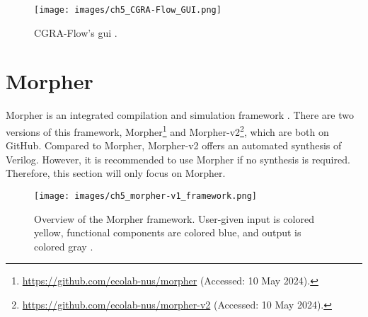     \begin{figure}[htb]
      \centering
      \texttt{[image: images/ch5\_CGRA-Flow\_GUI.png]}
      \caption{CGRA-Flow's \acf{gui} \cite{cgra-flow}.}
      \label{fig:cgra-flow_gui}
    \end{figure}

\section{Morpher}\label{section:morpher}
    Morpher is an integrated compilation and simulation framework \cite{morpher}.
    There are two versions of this framework, Morpher\footnote{\url{https://github.com/ecolab-nus/morpher} (Accessed: 10 May 2024).} and 
    Morpher-v2\footnote{\url{https://github.com/ecolab-nus/morpher-v2} (Accessed: 10 May 2024).}, which are both on GitHub.
    Compared to Morpher, Morpher-v2 offers an automated synthesis of Verilog.
    However, it is recommended to use Morpher if no synthesis is required.
    Therefore, this section will only focus on Morpher.

    \begin{figure}[htb]
      \centering
      \texttt{[image: images/ch5\_morpher-v1\_framework.png]}
      \caption{%
        Overview of the Morpher framework.
        User-given input is colored yellow, functional components are colored blue, and output is colored gray \cite{6_MorpherWOSET}.
      }
      \label{fig:morpher-v1_framework}
    \end{figure}

